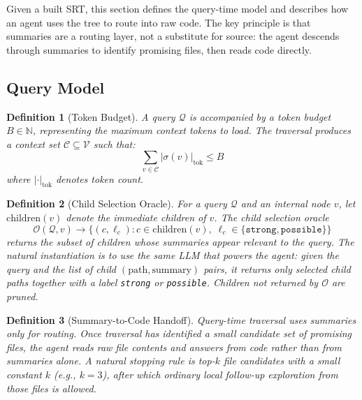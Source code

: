 \documentclass[11pt,a4paper]{article}
\newtheorem{definition}{Definition}
\newcommand{\srt}{\textsc{SRT}}
\newcommand{\summ}{\sigma}
\newcommand{\tbudget}{B}
\newcommand{\query}{\mathcal{Q}}
\newcommand{\context}{\mathcal{C}}
\newcommand{\nodes}{\mathcal{V}}
\begin{document}
Given a built \srt{}, this section defines the query-time model and describes how an agent uses the tree to route into raw code.
The key principle is that summaries are a routing layer, not a substitute for source: the agent descends through summaries to identify promising files, then reads code directly.

\subsection{Query Model}\label{sec:querymodel}

\begin{definition}[Token Budget]\label{def:budget}
A query $\query$ is accompanied by a token budget $\tbudget \in \mathbb{N}$, representing the maximum context tokens to load.
The traversal produces a context set $\context \subseteq \nodes$ such that:
\begin{equation}\label{eq:budget}
    \sum_{v \in \context} |\summ(v)|_{\text{tok}} \leq \tbudget
\end{equation}
where $|\cdot|_{\text{tok}}$ denotes token count.
\end{definition}

\begin{definition}[Child Selection Oracle]\label{def:relevance}
For a query $\query$ and an internal node $v$, let $\text{children}(v)$ denote the immediate children of $v$.
The child selection oracle
\[
\mathcal{O}(\query, v) \to \{(c, \ell_c) : c \in \text{children}(v),\; \ell_c \in \{\texttt{strong},\texttt{possible}\}\}
\]
returns the subset of children whose summaries appear relevant to the query.
The natural instantiation is to use the same LLM that powers the agent: given the query and the list of child $(\text{path}, \text{summary})$ pairs, it returns only selected child paths together with a label \texttt{strong} or \texttt{possible}.
Children not returned by $\mathcal{O}$ are pruned.
\end{definition}

\begin{definition}[Summary-to-Code Handoff]\label{def:sufficiency}
Query-time traversal uses summaries only for routing.
Once traversal has identified a small candidate set of promising files, the agent reads raw file contents and answers from code rather than from summaries alone.
A natural stopping rule is top-$k$ file candidates with a small constant $k$ (e.g., $k{=}3$), after which ordinary local follow-up exploration from those files is allowed.
\end{definition}
\end{document}
